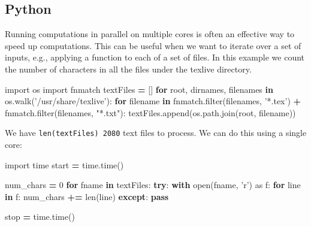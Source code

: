 \documentclass[]{book}
\newenvironment{Shaded}{\begin{snugshade}}{\end{snugshade}}
\newcommand{\KeywordTok}[1]{\textcolor[rgb]{0.13,0.29,0.53}{\textbf{#1}}}
\newcommand{\DecValTok}[1]{\textcolor[rgb]{0.00,0.00,0.81}{#1}}
\newcommand{\StringTok}[1]{\textcolor[rgb]{0.31,0.60,0.02}{#1}}
\newcommand{\ImportTok}[1]{#1}
\newcommand{\ControlFlowTok}[1]{\textcolor[rgb]{0.13,0.29,0.53}{\textbf{#1}}}
\newcommand{\OperatorTok}[1]{\textcolor[rgb]{0.81,0.36,0.00}{\textbf{#1}}}
\newcommand{\BuiltInTok}[1]{#1}
\newcommand{\NormalTok}[1]{#1}
\begin{document}
\subsection{Python}\label{python}

Running computations in parallel on multiple cores is often an effective
way to speed up computations. This can be useful when we want to iterate
over a set of inputs, e.g., applying a function to each of a set of
files. In this example we count the number of characters in all the
files under the texlive directory.

\begin{Shaded}
\begin{Highlighting}[]
\ImportTok{import}\NormalTok{ os}
\ImportTok{import}\NormalTok{ fnmatch}
\NormalTok{textFiles }\OperatorTok{=}\NormalTok{ []}
\ControlFlowTok{for}\NormalTok{ root, dirnames, filenames }\KeywordTok{in}\NormalTok{ os.walk(}\StringTok{'/usr/share/texlive'}\NormalTok{):}
    \ControlFlowTok{for}\NormalTok{ filename }\KeywordTok{in}\NormalTok{ fnmatch.}\BuiltInTok{filter}\NormalTok{(filenames, }\StringTok{'*.tex'}\NormalTok{) }\OperatorTok{+}\NormalTok{ fnmatch.}\BuiltInTok{filter}\NormalTok{(filenames, }\StringTok{"*.txt"}\NormalTok{):}
\NormalTok{        textFiles.append(os.path.join(root, filename))}
\end{Highlighting}
\end{Shaded}

We have \texttt{len(textFiles)\ 2080} text files to process. We can do
this using a single core:

\begin{Shaded}
\begin{Highlighting}[]
\ImportTok{import}\NormalTok{ time}
\NormalTok{start }\OperatorTok{=}\NormalTok{ time.time()}

\NormalTok{num_chars }\OperatorTok{=} \DecValTok{0}
\ControlFlowTok{for}\NormalTok{ fname }\KeywordTok{in}\NormalTok{ textFiles:}
    \ControlFlowTok{try}\NormalTok{:}
        \ControlFlowTok{with} \BuiltInTok{open}\NormalTok{(fname, }\StringTok{'r'}\NormalTok{) }\ImportTok{as}\NormalTok{ f:}
            \ControlFlowTok{for}\NormalTok{ line }\KeywordTok{in}\NormalTok{ f:}
\NormalTok{                num_chars }\OperatorTok{+=} \BuiltInTok{len}\NormalTok{(line)}
    \ControlFlowTok{except}\NormalTok{:}
        \ControlFlowTok{pass}

\NormalTok{stop }\OperatorTok{=}\NormalTok{ time.time()}
\end{Highlighting}
\end{Shaded}
\end{document}
